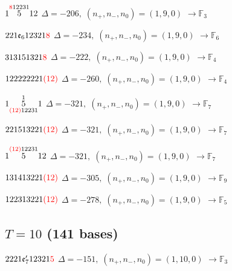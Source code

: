 \documentclass[10pt]{article}
\begin{document}
$1\overset{\textcolor{red}{8}12231}{5}12$ \quad $\Delta=-206,\; (n_+,n_-,n_0)=(1,9,0)$ \quad $\to \mathbb{F}_{3}$

\smallskip

$221\mathfrak{e}_612321\textcolor{red}{8}$ \quad $\Delta=-234,\; (n_+,n_-,n_0)=(1,9,0)$ \quad $\to \mathbb{F}_{6}$

\smallskip

$313151321\textcolor{red}{8}$ \quad $\Delta=-222,\; (n_+,n_-,n_0)=(1,9,0)$ \quad $\to \mathbb{F}_{4}$

\smallskip

$122222221\textcolor{red}{(12)}$ \quad $\Delta=-260,\; (n_+,n_-,n_0)=(1,9,0)$ \quad $\to \mathbb{F}_{4}$

\smallskip

$1\overset{1}{\underset{\textcolor{red}{(12)}12231}{5}}1$ \quad $\Delta=-321,\; (n_+,n_-,n_0)=(1,9,0)$ \quad $\to \mathbb{F}_{7}$

\smallskip

$221513221\textcolor{red}{(12)}$ \quad $\Delta=-321,\; (n_+,n_-,n_0)=(1,9,0)$ \quad $\to \mathbb{F}_{7}$

\smallskip

$1\overset{\textcolor{red}{(12)}12231}{5}12$ \quad $\Delta=-321,\; (n_+,n_-,n_0)=(1,9,0)$ \quad $\to \mathbb{F}_{7}$

\smallskip

$131413221\textcolor{red}{(12)}$ \quad $\Delta=-305,\; (n_+,n_-,n_0)=(1,9,0)$ \quad $\to \mathbb{F}_{9}$

\smallskip

$122313221\textcolor{red}{(12)}$ \quad $\Delta=-278,\; (n_+,n_-,n_0)=(1,9,0)$ \quad $\to \mathbb{F}_{5}$


\subsection*{$T = 10$ \quad (141 bases)}
\smallskip

$2221\mathfrak{e}_7'12321\textcolor{red}{5}$ \quad $\Delta=-151,\; (n_+,n_-,n_0)=(1,10,0)$ \quad $\to \mathbb{F}_{3}$
\end{document}
